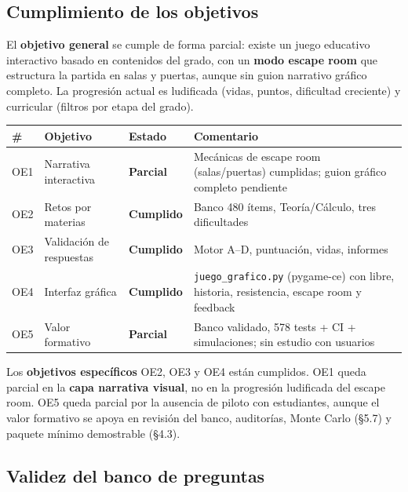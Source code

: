 \documentclass[11pt,a4paper]{article}
\newcommand{\iniciotabla}{\par\medskip\renewcommand{\arraystretch}{1.12}}
\newcommand{\fintabla}{\par\medskip}
\begin{document}
\subsection{Cumplimiento de los objetivos}

El \textbf{objetivo general} se cumple de forma parcial: existe un juego educativo interactivo basado en contenidos del grado, con un \textbf{modo escape room} que estructura la partida en salas y puertas, aunque sin guion narrativo gráfico completo. La progresión actual es ludificada (vidas, puntos, dificultad creciente) y curricular (filtros por etapa del grado).

\iniciotabla
\begin{tabular}{@{}l>{\raggedright\arraybackslash}p{2.8cm}>{\raggedright\arraybackslash}p{2.2cm}>{\raggedright\arraybackslash}p{5.8cm}@{}}
\toprule
\textbf{\#} & \textbf{Objetivo} & \textbf{Estado} & \textbf{Comentario} \\
\midrule
OE1 & Narrativa interactiva & \textbf{Parcial} & Mecánicas de escape room (salas/puertas) cumplidas; guion gráfico completo pendiente \\
OE2 & Retos por materias & \textbf{Cumplido} & Banco 480 ítems, Teoría/Cálculo, tres dificultades \\
OE3 & Validación de respuestas & \textbf{Cumplido} & Motor A--D, puntuación, vidas, informes \\
OE4 & Interfaz gráfica & \textbf{Cumplido} & \texttt{juego\_grafico.py} (pygame-ce) con libre, historia, resistencia, escape room y feedback \\
OE5 & Valor formativo & \textbf{Parcial} & Banco validado, 578 tests + CI + simulaciones; sin estudio con usuarios \\
\bottomrule
\end{tabular}
\fintabla

Los \textbf{objetivos específicos} OE2, OE3 y OE4 están cumplidos. OE1 queda parcial en la \textbf{capa narrativa visual}, no en la progresión ludificada del escape room. OE5 queda parcial por la ausencia de piloto con estudiantes, aunque el valor formativo se apoya en revisión del banco, auditorías, Monte Carlo (§5.7) y paquete mínimo demostrable (§4.3).

\subsection{Validez del banco de preguntas}
\end{document}
